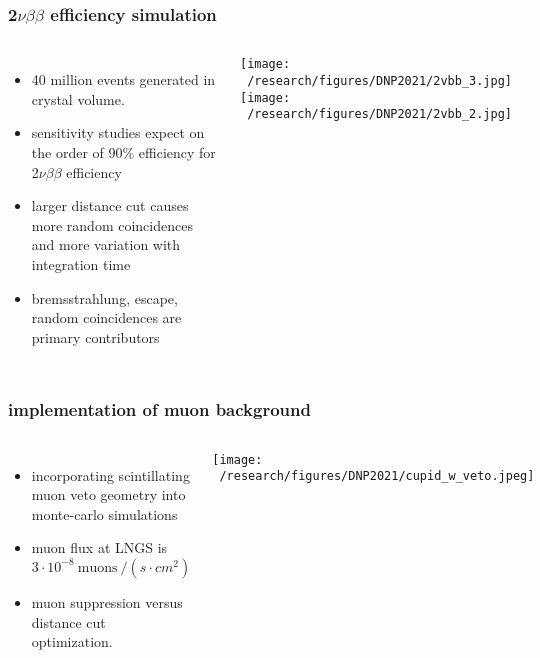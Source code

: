 \documentclass{beamer}
\begin{document}


	\begin{frame}
		\frametitle{2$\nu\beta\beta$ efficiency simulation}
		\begin{columns}[c] %
			
			\begin{itemize}
				\setlength\itemsep{2em}
				\item 40 million events generated in crystal volume.
				\item sensitivity studies expect on the order of 90$\%$ efficiency for 2$\nu\beta\beta$ efficiency
				\item larger distance cut causes more random coincidences and more variation with integration time
				\item bremsstrahlung, escape, random coincidences are primary contributors
			\end{itemize}
			
			\hspace*{0.5cm}\texttt{[image: ~/research/figures/DNP2021/2vbb\_3.jpg]}
			\medskip
			\hspace*{0.5cm}\texttt{[image: ~/research/figures/DNP2021/2vbb\_2.jpg]}
			
		\end{columns}
	\end{frame}



	\begin{frame}
		\frametitle{implementation of muon background}
		\begin{columns}[c] %
			
			\begin{itemize}
				\setlength\itemsep{2em}
				\item incorporating scintillating muon veto geometry into monte-carlo simulations
				\item muon flux at LNGS is $3\cdot 10^{-8} \ \text{muons} \ / \left(s\cdot cm^2\right)$
				\item muon suppression versus distance cut optimization.
			\end{itemize}
			
			\texttt{[image: ~/research/figures/DNP2021/cupid\_w\_veto.jpeg]}

			
		\end{columns}
	\end{frame}
\end{document}
